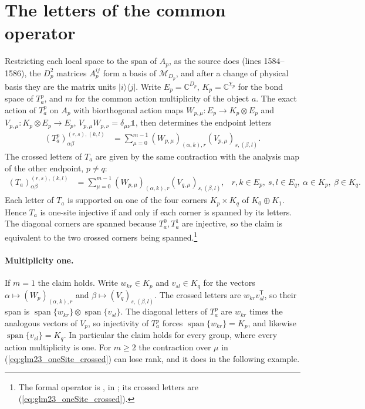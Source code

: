 \documentclass{article}
\begin{document}
\section{The letters of the common operator}
Restricting each local space to the span of $A_p$, as the source does
(lines 1584--1586), the $D_p^2$ matrices $A_p^{ij}$ form a basis of
$\mathcal M_{D_p}$, and after a change of physical basis they are the matrix
units $|i\rangle\langle j|$. Write $E_p=\mathbb C^{D_p}$, $K_p=\mathbb C^{\chi_p}$
for the bond space of $T^p_a$, and $m$ for the common action
multiplicity of the object $a$. The exact action of $T^p_a$ on $A_p$ with
biorthogonal action maps $W_{p,\mu}:E_p\to K_p\otimes E_p$ and
$V_{p,\mu}:K_p\otimes E_p\to E_p$, $V_{p,\mu}W_{p,\nu}=\delta_{\mu\nu}\mathbb 1$,
then determines the endpoint letters
\begin{align}
    (T^p_a)^{(r,s),(k,l)}_{\alpha\beta}
     & =\sum_{\mu=0}^{m-1}(W_{p,\mu})_{(\alpha,k),r}(V_{p,\mu})_{s,(\beta,l)}.
    \label{eq:glm23_oneSite_endpoint}
\end{align}
The crossed letters of $T_a$ are given by the same contraction with the
analysis map of the other endpoint, $p\ne q$:
\begin{align}
    (T_a)^{(r,s),(k,l)}_{\alpha\beta}
     & =\sum_{\mu=0}^{m-1}(W_{p,\mu})_{(\alpha,k),r}(V_{q,\mu})_{s,(\beta,l)},
     &
    r,k\in E_p,\ s,l\in E_q,\ \alpha\in K_p,\ \beta\in K_q.
    \label{eq:glm23_oneSite_crossed}
\end{align}
Each letter of $T_a$ is supported on one of the four corners
$K_p\times K_q$ of $K_0\oplus K_1$. Hence $T_a$ is one-site injective if and
only if each corner is spanned by its letters. The diagonal corners are
spanned because $T^0_a,T^1_a$ are injective, so the claim is equivalent to
the two crossed corners being spanned.\footnote{The formal operator is
    , in
    ; its crossed
    letters are (\ref{eq:glm23_oneSite_crossed}).}

\paragraph{Multiplicity one.} If $m=1$ the claim holds. Write
$w_{kr}\in K_p$ and $v_{sl}\in K_q$ for the vectors
$\alpha\mapsto(W_p)_{(\alpha,k),r}$ and $\beta\mapsto(V_q)_{s,(\beta,l)}$.
The crossed letters are $w_{kr}v_{sl}^{\mathsf T}$, so their span is
$\operatorname{span}\{w_{kr}\}\otimes\operatorname{span}\{v_{sl}\}$. The
diagonal letters of $T^p_a$ are $w_{kr}$ times the analogous vectors of
$V_p$, so injectivity of $T^p_a$ forces $\operatorname{span}\{w_{kr}\}=K_p$,
and likewise $\operatorname{span}\{v_{sl}\}=K_q$. In particular the claim
holds for every group, where every action multiplicity is one. For $m\ge2$
the contraction over $\mu$ in (\ref{eq:glm23_oneSite_crossed}) can lose
rank, and it does in the following example.
\end{document}
